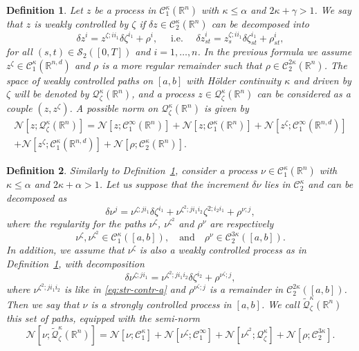 \documentclass[10pt,a4paper]{amsart}
\newtheorem{definition}{Definition}
\newcommand{\R}{\mathbb R}
\newcommand{\al}{\alpha}
\newcommand{\beq}{\begin{equation}}
\newcommand{\bzeta}{{\zeta}}
\newcommand{\cac}{\mathcal C}
\newcommand{\cn}{\mathcal N}
\newcommand{\cq}{\mathcal Q}
\newcommand{\der}{\delta}
\newcommand{\eeq}{\end{equation}}
\newcommand{\ga}{\gamma}
\newcommand{\ka}{\kappa}
\begin{document}
\begin{definition}\label{def:weakly-ctrld}
	Let $z$ be a process in $\cac_{1}^{\ka}(\R^n)$ with $\ka \leq \al$ and $2\ka +\ga > 1$. We say that $z$ is weakly controlled by $\zeta$ if $\der z \in \cac_2^{\ka}(\R^n)$ can be decomposed into
	\begin{equation}\label{eq:weakly-controlled}
	\der z^{i} = z^{\zeta;i i_1} \der \zeta^{i_1} + \rho^{i}, 
	\quad\text{   i.e.  }\quad
{\der z}_{st}^{i} = z_{s}^{\zeta;i i_1}{\der \zeta}_{st}^{i_1} + \rho_{st}^{i} ,
	\end{equation}
	for all $(s,t) \in \mathcal{S}_2 \left([0,T]\right)$ and $i=1, \ldots,n$. In the previous formula we assume $z^{\zeta} \in \cac_{1}^{\ka}(\R^{n,d})$ and $\rho$ is a more regular remainder such that $\rho \in \cac_{2}^{2\ka}(\R^{n})$. The space of weakly controlled paths on $[a,b]$ with H\"older continuity $\ka$ and driven by $\zeta$ will be denoted by $\mathcal{Q}_{\zeta}^{\ka}(\R^n)$, and a process $z \in \mathcal{Q}_{\zeta}^{\ka}(\R^n)$ can be considered as a couple $(z, z^\zeta)$. A possible norm on $\mathcal{Q}_{\zeta}^{\ka}(\R^n)$ is given by
	\begin{multline}\label{eq:norm-controlled}
	\cn[z;\mathcal{Q}_{\zeta}^{\ka}(\R^n)] = 
	\cn[z; \cac_1^{\infty}(\R^n)]+\cn[z; \cac_1^{\ka}(\R^n)] + \cn[z^\zeta; \cac_1^{\infty}(\R^{n,d})] \\+ \cn[z^\zeta; \cac_1^{\ka}(\R^{n,d})] + \cn[\rho; \cac_2^{\ka}(\R^n)].
	\end{multline}
\end{definition}

\begin{definition}\label{def:str-contr}
Similarly to Definition~\ref{def:weakly-ctrld}, consider a process $\nu \in \cac_1^{\ka}(\R^n)$ with $\ka \leq \al$ and $2\ka+\al > 1$. Let us suppose that the increment $\der \nu$ lies in $\cac_2^{\ka}$ and can be decomposed as 
\beq\label{eq:str-contr-a}
\der \nu^j = \nu^{\zeta;j i_1} \der \zeta^{i_1} + \nu^{\bzeta^{2}; j i_1 i_2} \bzeta^{2; i_2 i_1} + \rho^{\nu;j},
\eeq
where the regularity for the paths $\nu^{\zeta}$, $\nu^{\bzeta^2}$ and $\rho^{\nu}$ are respectively
\beq\label{eq:str-contr-b}
\nu^{\zeta}, \nu^{\bzeta^2} \in \cac_1^{\ka}([a,b]), \quad\text{and}\quad \rho^{\nu} \in \cac_2^{3\ka}([a,b]).
\eeq
In addition, we assume that $\nu^{\zeta}$ is also a weakly controlled process as in Definition~\ref{def:weakly-ctrld}, with decomposition
\beq\label{eq:str-contr-l}
\der \nu^{\zeta; ji_1} = \nu^{\zeta^{2}; j i_1 i_2} \der \zeta^{i_2} + \rho^{\nu^{\zeta};j},
\eeq
where $\nu^{\zeta^{2}; j i_1 i_2}$ is like in \eqref{eq:str-contr-a} and $\rho^{\nu^{\zeta}; j}$ is a remainder in $\cac_2^{2\ka}([a,b])$. Then we say that $\nu$ is a strongly controlled process in $[a,b]$. We call $\tilde{\cq}_{\zeta}^{\ka}(\R^n)$ this set of paths, equipped with the semi-norm
$$
\cn[\nu; \tilde{\cq}_{\zeta}^{\ka}(\R^n)] = \cn[\nu;\cac_1^{\ka}] + \cn[\nu^{\zeta};\cac_1^{\infty}] + \cn[\nu^{\zeta^{2}}; \cq_{\zeta}^{\ka}] + \cn[\rho;\cac_2^{3\ka}].
$$
\end{definition}
\end{document}
